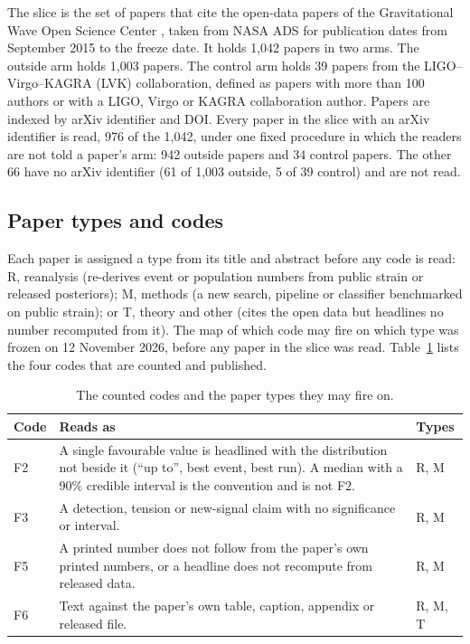 \documentclass[reprint,amsmath,amssymb,aps,superscriptaddress,nofootinbib]{revtex4-2}
\begin{document}
The slice is the set of papers that cite the open-data papers of the Gravitational Wave Open Science Center \cite{GWOSC2021,GWOSC2023,Vallisneri2015}, taken from NASA ADS for publication dates from September 2015 to the freeze date. It holds 1,042 papers in two arms. The outside arm holds 1,003 papers. The control arm holds 39 papers from the LIGO--Virgo--KAGRA (LVK) collaboration, defined as papers with more than 100 authors or with a LIGO, Virgo or KAGRA collaboration author. Papers are indexed by arXiv identifier and DOI. Every paper in the slice with an arXiv identifier is read, 976 of the 1,042, under one fixed procedure in which the readers are not told a paper's arm: 942 outside papers and 34 control papers. The other 66 have no arXiv identifier (61 of 1,003 outside, 5 of 39 control) and are not read.

\subsection{Paper types and codes}

Each paper is assigned a type from its title and abstract before any code is read: R, reanalysis (re-derives event or population numbers from public strain or released posteriors); M, methods (a new search, pipeline or classifier benchmarked on public strain); or T, theory and other (cites the open data but headlines no number recomputed from it). The map of which code may fire on which type was frozen on 12 November 2026, before any paper in the slice was read. Table~\ref{tab:codes} lists the four codes that are counted and published.

\begin{table}[t]
\caption{The counted codes and the paper types they may fire on.}
\label{tab:codes}
\centering\small
\begin{tabularx}{\linewidth}{l>{\raggedright\arraybackslash}X l}
\hline\hline
Code & Reads as & Types \\ \hline
F2 & A single favourable value is headlined with the distribution not beside it (``up to'', best event, best run). A median with a 90\% credible interval is the convention and is not F2. & R, M \\
F3 & A detection, tension or new-signal claim with no significance or interval. & R, M \\
F5 & A printed number does not follow from the paper's own printed numbers, or a headline does not recompute from released data. & R, M \\
F6 & Text against the paper's own table, caption, appendix or released file. & R, M, T \\
\hline\hline
\end{tabularx}
\end{table}
\end{document}
